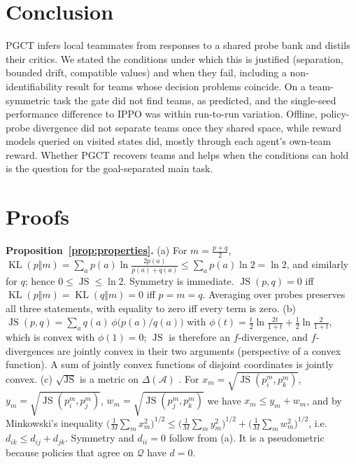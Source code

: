 \documentclass{article}
\theoremstyle{remark}
\newcommand{\JS}{\operatorname{JS}}
\newcommand{\KL}{\operatorname{KL}}
\newcommand{\ours}{PGCT}
\begin{document}
\section{Conclusion}
\ours{} infers local teammates from responses to a shared probe bank and distils their critics. We stated the conditions under
which this is justified (separation, bounded drift, compatible values) and when they fail, including a non-identifiability
result for teams whose decision problems coincide. On a team-symmetric task the gate did not find teams, as predicted, and the
single-seed performance difference to IPPO was within run-to-run variation. Offline, policy-probe divergence did not separate
teams once they shared space, while reward models queried on visited states did, mostly through each agent's own-team reward.
Whether \ours{} recovers teams and helps when the conditions can hold is the question for the goal-separated main task.

\ifdefined\ijcaistyle
  
\else
  
\fi


\clearpage
\appendix
\onecolumn

\section{Proofs}
\label{app:proofs}

\textbf{Proposition~\ref{prop:properties}.}
(a) For $m=\frac{p+q}{2}$, $\KL(p\Vert m)=\sum_a p(a)\ln\frac{2p(a)}{p(a)+q(a)}\le\sum_a p(a)\ln 2=\ln 2$, and similarly for $q$; hence
$0\le\JS\le\ln2$. Symmetry is immediate. $\JS(p,q)=0$ iff $\KL(p\Vert m)=\KL(q\Vert m)=0$ iff $p=m=q$. Averaging over probes preserves
all three statements, with equality to zero iff every term is zero.
(b) $\JS(p,q)=\sum_a q(a)\,\phi\!\big(p(a)/q(a)\big)$ with $\phi(t)=\frac{t}{2}\ln\frac{2t}{1+t}+\frac12\ln\frac{2}{1+t}$, which is convex
with $\phi(1)=0$; $\JS$ is therefore an $f$-divergence, and $f$-divergences are jointly convex in their two arguments (perspective of a
convex function). A sum of jointly convex functions of disjoint coordinates is jointly convex.
(c) $\sqrt{\JS}$ is a metric on $\Delta(\mathcal{A})$ \cite{endres2003metric}. For $x_m=\sqrt{\JS(p_i^m,p_k^m)}$,
$y_m=\sqrt{\JS(p_i^m,p_j^m)}$, $w_m=\sqrt{\JS(p_j^m,p_k^m)}$ we have $x_m\le y_m+w_m$, and by Minkowski's inequality
$\big(\frac1M\sum_m x_m^2\big)^{1/2}\le\big(\frac1M\sum_m y_m^2\big)^{1/2}+\big(\frac1M\sum_m w_m^2\big)^{1/2}$, i.e.\
$d_{ik}\le d_{ij}+d_{jk}$. Symmetry and $d_{ii}=0$ follow from (a). It is a pseudometric because policies that agree on $\mathcal{Q}$ have
$d=0$.
\end{document}
